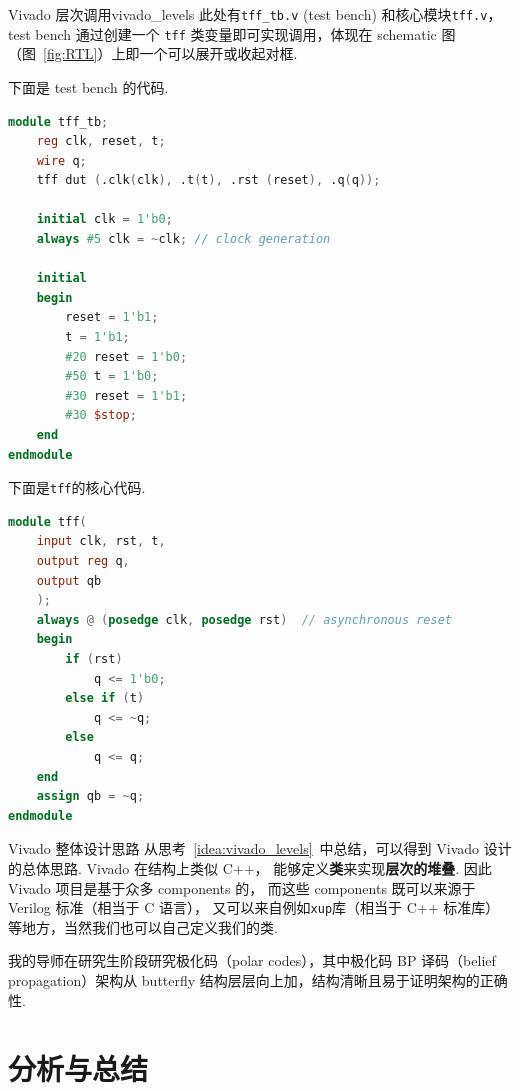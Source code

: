 \documentclass[fontset=windows,11pt]{SEU-Digital-Report}
\begin{document}
            \begin{idea}{Vivado 层次调用}{vivado_levels}
                此处有\texttt{tff\_tb.v} (test bench) 和核心模块\texttt{tff.v}，test bench 通过创建一个 \texttt{tff} 类变量即可实现调用，体现在 schematic 图（图~\ref{fig:RTL}）上即一个可以展开或收起对框.

                下面是 test bench 的代码.
                \begin{lstlisting}[numbers=none,language=verilog,title=tff\_tb.v,backgroundcolor=\color{blue!3},morekeywords={tff}]
module tff_tb;
    reg clk, reset, t;
    wire q;
    tff dut (.clk(clk), .t(t), .rst (reset), .q(q));
    
    initial clk = 1'b0;
    always #5 clk = ~clk; // clock generation
    
    initial
    begin
        reset = 1'b1;
        t = 1'b1;
        #20 reset = 1'b0; 
        #50 t = 1'b0;
        #30 reset = 1'b1;
        #30 $stop;
    end
endmodule
                \end{lstlisting}
                下面是\texttt{tff}的核心代码.
                \begin{lstlisting}[numbers=none,language=verilog,title=tff.v,backgroundcolor=\color{blue!3}]
module tff(
    input clk, rst, t,
    output reg q, 
    output qb
    );
    always @ (posedge clk, posedge rst)  // asynchronous reset
    begin
        if (rst)
            q <= 1'b0;
        else if (t)
            q <= ~q;
        else 
            q <= q;
    end  
    assign qb = ~q;
endmodule
            \end{lstlisting}
            \end{idea}

            \begin{idea}{Vivado 整体设计思路}{}
                从思考~\ref{idea:vivado_levels}~中总结，可以得到 Vivado 设计的总体思路.
                Vivado 在结构上类似 C++，
                能够定义\textbf{类}来实现\textbf{层次的堆叠}.
                因此 Vivado 项目是基于众多 components 的，
                而这些 components 既可以来源于 Verilog 标准（相当于 C 语言），
                又可以来自例如\texttt{xup}库（相当于 C++ 标准库）等地方，当然我们也可以自己定义我们的类.

                我的导师在研究生阶段研究极化码（polar codes），其中极化码 BP 译码（belief propagation）架构从 butterfly 结构层层向上加，结构清晰且易于证明架构的正确性.
            \end{idea}

    \section{分析与总结}
\end{document}
